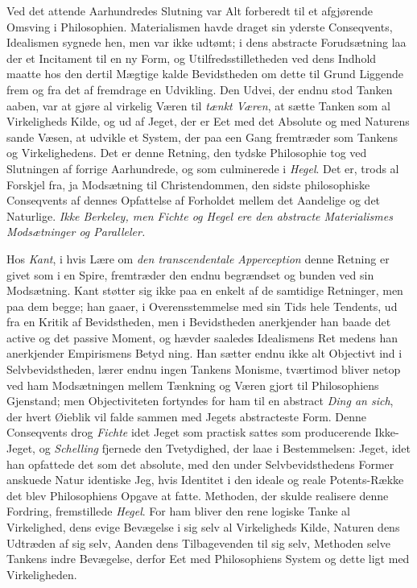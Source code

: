 \documentclass[12pt,a4paper]{book}
\newcommand{\opage}[1]{\marginnote{\footnotesize\textit{[#1]}}}
\begin{document}
Ved det attende Aarhundredes Slutning var Alt forberedt til et
afgjørende Omsving i Philosophien. Materialismen havde draget sin
yderste Conseqvents, Idealismen sygnede hen, men var ikke udtømt; i
dens abstracte Forudsætning laa der et Incitament til en ny Form, og
Utilfredsstilletheden ved dens Indhold maatte hos den dertil Mægtige
kalde Bevidstheden om dette til Grund Liggende frem og fra det af
fremdrage en Udvikling. Den Udvei, der endnu stod Tanken aaben, var at
gjøre al virkelig Væren til \emph{tænkt Væren}, at sætte Tanken som al
Virkeligheds Kilde, og ud af Jeget, der er Eet med det Absolute og med
Naturens sande Væsen, at udvikle et System, der paa een Gang
fremtræder som Tankens og Virkelighedens. Det er denne Retning, den
tydske Philosophie tog ved Slutningen af forrige Aarhundrede, og som
culminerede i \emph{Hegel}. Det er, trods al Forskjel fra, ja
Modsætning til Christendommen, den sidste philosophiske Conseqvents af
dennes Opfattelse af Forholdet mellem det Aandelige og det Naturlige.
\emph{Ikke Berkeley, men Fichte og Hegel ere den abstracte
Materialismes Modsætninger og Paralleler.}

Hos \emph{Kant}, i hvis Lære om \emph{den transcendentale
Apperception} denne Retning er givet som i en Spire, fremtræder den
endnu begrændset og bunden ved sin Modsætning. Kant støtter sig ikke
paa en enkelt af de samtidige Retninger, men paa dem begge; han gaaer,
i Overensstemmelse med sin Tids hele Tendents, ud fra en Kritik af
Bevidstheden, men i Bevidstheden anerkjender han baade det active og
det passive Moment, og hævder saaledes Idealismens Ret medens han
anerkjender Empirismens Betyd\-%
\opage{11}ning. Han sætter endnu ikke alt Objectivt ind i Selvbevidstheden,
lærer endnu ingen Tankens Monisme, tværtimod bliver netop ved ham
Modsætningen mellem Tænkning og Væren gjort til Philosophiens
Gjenstand; men Objectiviteten fortyndes for ham til en abstract
\emph{Ding an sich}, der hvert Øieblik vil falde sammen med Jegets
abstracteste Form. Denne Conseqvents drog \emph{Fichte} idet Jeget som
practisk sattes som producerende Ikke-Jeget, og \emph{Schelling}
fjernede den Tvetydighed, der laae i Bestemmelsen: Jeget, idet han
opfattede det som det absolute, med den under Selvbevidsthedens Former
anskuede Natur identiske Jeg, hvis Identitet i den ideale og reale
Potents-Række det blev Philosophiens Opgave at fatte. Methoden, der
skulde realisere denne Fordring, fremstillede \emph{Hegel}. For ham
bliver den rene logiske Tanke al Virkelighed, dens evige Bevægelse i
sig selv al Virkeligheds Kilde, Naturen dens Udtræden af sig selv,
Aanden dens Tilbagevenden til sig selv, Methoden selve Tankens indre
Bevægelse, derfor Eet med Philosophiens System og dette ligt med
Virkeligheden.
\end{document}
